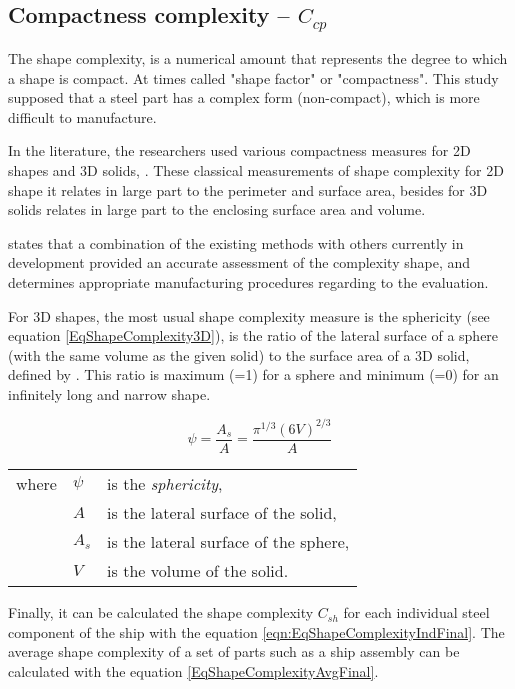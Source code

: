 \subsection{Compactness complexity -- $C_{cp}$}
The shape complexity, is a numerical amount that represents the degree to which a shape is compact. At times called "shape factor" or "compactness". This study supposed that a steel part has a complex form (non-compact), which is more difficult to manufacture.

In the literature, the researchers used various compactness measures for 2D shapes and 3D solids, \cite{valentan2008}. These classical measurements of shape complexity for 2D shape it relates in large part to the perimeter and surface area, besides for 3D solids relates in large part to the enclosing surface area and volume.

\cite{valentan2008} states that a combination of the existing methods with others currently in development provided an accurate assessment of the complexity shape, and determines appropriate manufacturing procedures regarding to the evaluation.

For 3D shapes, the most usual shape complexity measure is the sphericity (see equation \ref{EqShapeComplexity3D}), is the ratio of the lateral surface of a sphere (with the same volume as the given solid) to the surface area of a 3D solid, defined by \cite{wadell1935volume}. %
This ratio is maximum (=1) for a sphere and minimum (=0) for an infinitely long and narrow shape.

\begin{equation}
\psi = \frac{A_s}{A}= \frac{\pi^{1/3}(6V)^{2/3}}{A}
\label{eqn:EqShapeComplexity3D}
\end{equation}

\begin{tabular}{l l l}
where		& $\psi$ 	& is the \textit{sphericity},\\
				& $A$		& is the lateral surface of the solid,\\
				& $A_s$	& is the lateral surface of the sphere,\\
				& $V$		& is the volume of the solid.
\end{tabular}


Finally, it can be calculated the shape complexity $C_{sh}$ for each individual steel component of the ship with the equation \ref{eqn:EqShapeComplexityIndFinal}. The average shape complexity of a set of parts such as a ship assembly can be calculated  with the equation \ref{EqShapeComplexityAvgFinal}.


